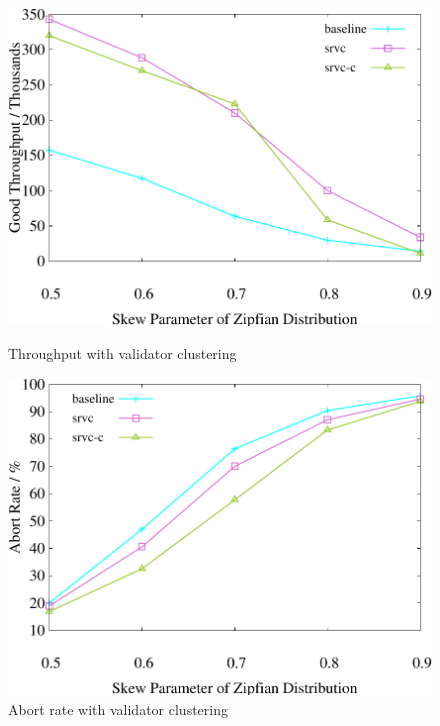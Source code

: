 \begin{figure}[b]
    \centering
    \begin{minipage}[b]{0.32\linewidth}
        \centering
        \includegraphics[width=\textwidth]{./exp_fig/cluster/tps}
        \vspace{-2em}
        \caption{Throughput with validator clustering}
        \label{fig:cluster:tps}
    \end{minipage}
    \begin{minipage}[b]{0.32\linewidth}
        \centering
        \includegraphics[width=\textwidth]{./exp_fig/cluster/abort}
        \vspace{-2em}
        \caption{Abort rate with validator clustering}

\end{minipage}
\end{figure}
